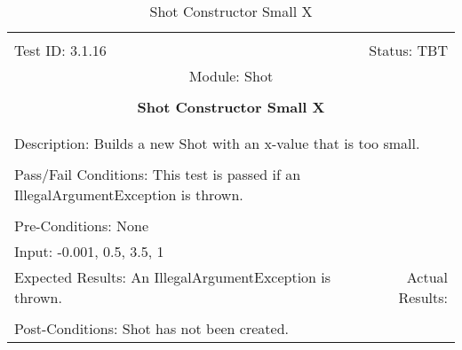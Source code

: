 \documentclass[titlepage]{article}
\begin{document}
\begin{center}%
\begin{table}[h!]
\begin{tabular}{|l r|}\hline&\\[-2mm]
	Test ID: 3.1.16	&Status: TBT\\[-3mm]
	\multicolumn{2}{|c|}{Module: Shot}\\&\\
	\multicolumn{2}{|c|}{\textbf{\large{Shot Constructor Small X}}}\\&\\\hline&\\[-3mm]
	\multicolumn{2}{|p{\textwidth}|}{Description: Builds a new Shot with an x-value that is too small.}\\[1mm]\hline&\\[-3mm]
	\multicolumn{2}{|p{\textwidth}|}{Pass/Fail Conditions: This test is passed if an IllegalArgumentException is thrown.}\\[1mm]\hline&\\[-3mm]
	\multicolumn{2}{|p{\textwidth}|}{Pre-Conditions: None}\\[4mm]
	\multicolumn{2}{|p{\textwidth}|}{Input: -0.001, 0.5, 3.5, 1}\\[2mm]\hline
	\multicolumn{1}{|p{0.49\textwidth}}{Expected Results: An IllegalArgumentException is thrown.}	&\multicolumn{1}{|p{0.45\textwidth}|}{Actual Results: }\\\hline&\\[-3mm]
	\multicolumn{2}{|p{\textwidth}|}{Post-Conditions: Shot has not been created.}\\\hline
\end{tabular}
\caption{Shot Constructor Small X}
\end{table}
\end{center}
\end{document}
